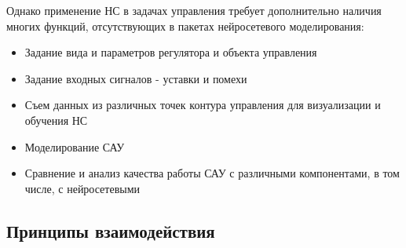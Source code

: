 Однако применение НС в задачах управления требует дополнительно
наличия многих функций, отсутствующих в пакетах нейросетевого
моделирования:

\begin{itemize}
\item Задание вида и параметров регулятора и объекта управления
\item Задание входных сигналов - уставки и помехи
\item Съем данных из различных точек контура управления для
  визуализации и обучения НС
\item Моделирование САУ
\item Сравнение и анализ качества работы САУ с различными
  компонентами, в том числе, с нейросетевыми
\end{itemize}


\subsection{Принципы взаимодействия}








